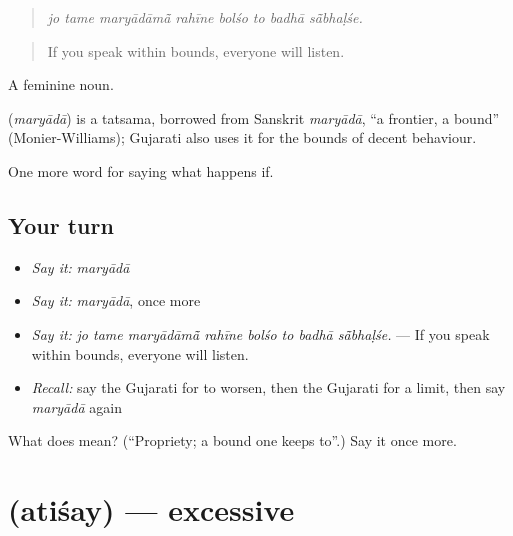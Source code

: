 \begin{quote}
\emph{jo tame maryādāmā̃ rahīne bolśo to badhā sā̃bhaḷśe.}
\end{quote}

\begin{quote}
If you speak within bounds, everyone will listen.
\end{quote}

A feminine noun.

\begin{cousinweb}
\textbf{} (\emph{maryādā}) is a tatsama, borrowed from Sanskrit \emph{maryādā}, \textquotedblleft{}a frontier, a bound\textquotedblright{} (Monier-Williams); Gujarati also uses it for the bounds of decent behaviour.
\end{cousinweb}

\begin{grammarlens}[title={What you've built}]
One more word for saying what happens if.
\end{grammarlens}

\subsection*{Your turn}
\begin{itemize}
\raggedright
  \item \emph{Say it:} \emph{maryādā}
  \item \emph{Say it:} \emph{maryādā}, once more
  \item \emph{Say it:} \emph{jo tame maryādāmā̃ rahīne bolśo to badhā sā̃bhaḷśe.} — If you speak within bounds, everyone will listen.
  \item \emph{Recall:} say the Gujarati for to worsen, then the Gujarati for a limit, then say \emph{maryādā} again
\end{itemize}

\begin{tcolorbox}[breakable,colback=teal!4,colframe=teal!35!black,title={Before you move on}]
What does  mean? (\textquotedblleft{}Propriety; a bound one keeps to\textquotedblright{}.) Say it once more.
\end{tcolorbox}
\section[\texorpdfstring{\gu{અતિશય} (atiśay)}{અતિશય (atiśay)}]{ (atiśay) — excessive}

\label{lesson:GU-C378-atisay}



